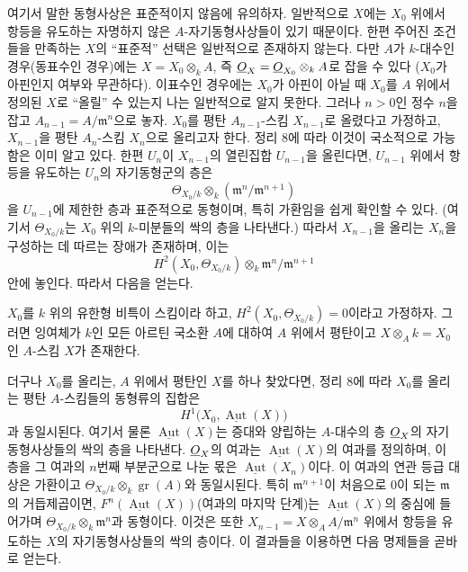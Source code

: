 여기서 말한 동형사상은 표준적이지 않음에 유의하자. 일반적으로 $X$에는
$X_0$ 위에서 항등을 유도하는 자명하지 않은 $A$-자기동형사상들이 있기
때문이다. 한편 주어진 조건들을 만족하는 $X$의 ``표준적'' 선택은 일반적으로
존재하지 않는다. 다만 $A$가 $k$-대수인 경우(동표수인 경우)에는
$X=X_0\otimes_k A$, 즉 $\underline{O}_X=\underline{O}_{X_0}\otimes_k A$로 잡을 수 있다
($X_0$가 아핀인지 여부와 무관하다). 이표수인 경우에는 $X_0$가 아핀이 아닐
때 $X_0$를 $A$ 위에서 정의된 $X$로 ``올릴'' 수 있는지 나는 일반적으로
알지 못한다. 그러나 $n>0$인 정수 $n$을 잡고
$A_{n-1}=A/\mathfrak m^n$으로 놓자. $X_0$를 평탄 $A_{n-1}$-스킴
$X_{n-1}$로 올렸다고 가정하고, $X_{n-1}$을 평탄 $A_n$-스킴 $X_n$으로
올리고자 한다. 정리 8에 따라 이것이 국소적으로 가능함은 이미 알고 있다.
한편 $U_n$이 $X_{n-1}$의 열린집합 $U_{n-1}$을 올린다면, $U_{n-1}$ 위에서
항등을 유도하는 $U_n$의 자기동형군의 층은
\[
  \Theta_{X_0/k}\otimes_k(\mathfrak m^n/\mathfrak m^{n+1})
\]
을 $U_{n-1}$에 제한한 층과 표준적으로 동형이며, 특히 가환임을 쉽게
확인할 수 있다. (여기서 $\Theta_{X_0/k}$는 $X_0$ 위의 $k$-미분들의
싹의 층을 나타낸다.) 따라서 $X_{n-1}$을 올리는 $X_n$을 구성하는 데
따르는 장애가 존재하며, 이는
\[
  H^2(X_0,\Theta_{X_0/k})\otimes_k
  \mathfrak m^n/\mathfrak m^{n+1}
\]
안에 놓인다. 따라서 다음을 얻는다.

 $X_0$를 $k$ 위의 유한형 비특이 스킴이라 하고,
$H^2(X_0,\Theta_{X_0/k})=0$이라고 가정하자. 그러면 잉여체가 $k$인 모든
아르틴 국소환 $A$에 대하여 $A$ 위에서 평탄이고
$X\otimes_A k=X_0$인 $A$-스킴 $X$가 존재한다.

더구나 $X_0$를 올리는, $A$ 위에서 평탄인 $X$를 하나 찾았다면, 정리 8에
따라 $X_0$를 올리는 평탄 $A$-스킴들의 동형류의 집합은
\[
  H^1\bigl(X_0,\underline{\operatorname{Aut}}(X)\bigr)
\]
과 동일시된다. 여기서 물론 $\underline{\operatorname{Aut}}(X)$는 증대와
양립하는 $A$-대수의 층 $\underline{O}_X$의 자기동형사상들의 싹의 층을 나타낸다.
$\underline{O}_X$의 여과는 $\underline{\operatorname{Aut}}(X)$의 여과를 정의하며,
이 층을 그 여과의 $n$번째 부분군으로 나눈 몫은
$\underline{\operatorname{Aut}}(X_n)$이다. 이 여과의 연관 등급 대상은
가환이고 $\Theta_{X_0/k}\otimes_k\operatorname{gr}(A)$와 동일시된다.
특히 $\mathfrak m^{n+1}$이 처음으로 0이 되는 $\mathfrak m$의 거듭제곱이면,
$F^n(\underline{\operatorname{Aut}}(X))$(여과의 마지막 단계)는
$\underline{\operatorname{Aut}}(X)$의 중심에 들어가며
$\Theta_{X_0/k}\otimes_k\mathfrak m^n$과 동형이다. 이것은 또한
$X_{n-1}=X\otimes_A A/\mathfrak m^n$ 위에서 항등을 유도하는 $X$의
자기동형사상들의 싹의 층이다. 이 결과들을 이용하면 다음 명제들을 곧바로
얻는다.

